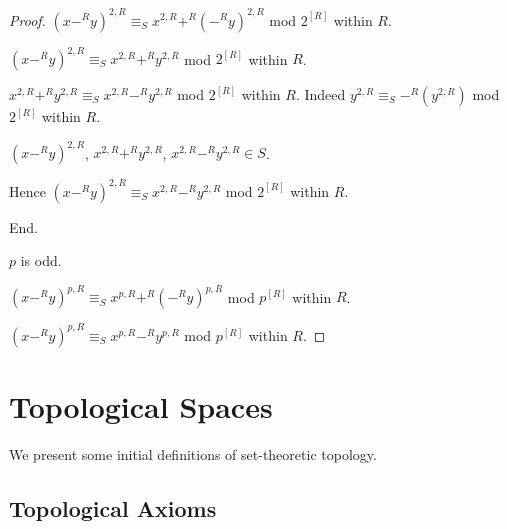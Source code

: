 \documentclass[11pt]{article}
\begin{document}
\begin{forthel}
\begin{proof}
$(x -^{R} y)^{2,R} \equiv_{S} x^{2,R} +^{R} (-^{R}y)^{2,R}$ mod $2^{[R]}$ within $R$.

$(x -^{R} y)^{2,R} \equiv_{S} x^{2,R} +^{R} y^{2,R}$ mod $2^{[R]}$ within $R$.

$x^{2,R} +^{R} y^{2,R} \equiv_{S} x^{2,R} -^{R} y^{2,R}$ mod $2^{[R]}$ within $R$.
Indeed $y^{2,R} \equiv_{S} -^{R}(y^{2,R})$ mod $2^{[R]}$ within $R$.

$(x -^{R} y)^{2,R}$, $x^{2,R} +^{R} y^{2,R}$, 
$x^{2,R} -^{R} y^{2,R} \in S$.

Hence $(x -^{R} y)^{2,R} \equiv_{S} x^{2,R} -^{R} y^{2,R}$ mod $2^{[R]}$ within $R$.

End. 

$p$ is odd.

$(x -^{R} y)^{p,R} \equiv_{S} x^{p,R} +^{R} (-^{R}y)^{p,R}$ mod $p^{[R]}$ within $R$.

$(x -^{R} y)^{p,R} \equiv_{S} x^{p,R} -^{R} y^{p,R}$ mod $p^{[R]}$ within $R$.
\end{proof}
\end{forthel}

\section{Topological Spaces}

We present some initial definitions of set-theoretic topology.

\subsection{Topological Axioms}
\end{document}
